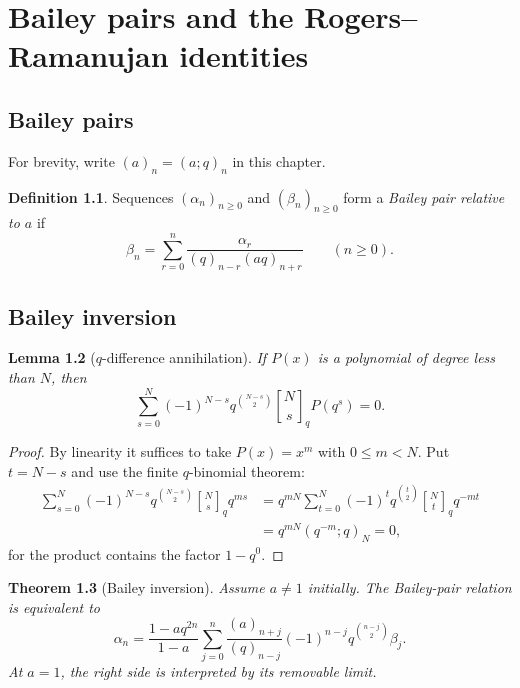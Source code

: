 \documentclass[11pt,oneside,openany]{book}
\newtheorem{theorem}{Theorem}[chapter]
\newtheorem{lemma}[theorem]{Lemma}
\theoremstyle{definition}
\newtheorem{definition}[theorem]{Definition}
\theoremstyle{remark}
\newcommand{\qbinom}[2]{\genfrac{[}{]}{0pt}{}{#1}{#2}_{q}}
\begin{document}
\chapter{Bailey pairs and the Rogers--Ramanujan identities}\label{chap:bailey}

\section{Bailey pairs}

For brevity, write $(a)_n=(a;q)_n$ in this chapter.

\begin{definition}
Sequences $(\alpha_n)_{n\ge0}$ and $(\beta_n)_{n\ge0}$ form a \emph{Bailey pair relative to $a$} if
\[
 \beta_n=\sum_{r=0}^{n}\frac{\alpha_r}{(q)_{n-r}(aq)_{n+r}}
 \qquad(n\ge0).
\]
\end{definition}

\section{Bailey inversion}

\begin{lemma}[$q$-difference annihilation]\label{lem:qdiff-annihilation}
If $P(x)$ is a polynomial of degree less than $N$, then
\[
 \sum_{s=0}^{N}(-1)^{N-s}q^{\binom{N-s}{2}}
 \qbinom Ns P(q^s)=0.
\]
\end{lemma}

\begin{proof}
By linearity it suffices to take $P(x)=x^m$ with $0\le m<N$.  Put $t=N-s$ and use the finite $q$-binomial theorem:
\begin{align*}
 \sum_{s=0}^{N}(-1)^{N-s}q^{\binom{N-s}{2}}\qbinom Ns q^{ms}
 &=q^{mN}\sum_{t=0}^{N}(-1)^tq^{\binom t2}\qbinom Ntq^{-mt}\\
 &=q^{mN}(q^{-m};q)_N=0,
\end{align*}
for the product contains the factor $1-q^0$.
\end{proof}

\begin{theorem}[Bailey inversion]\label{thm:bailey-inversion}
Assume $a\ne1$ initially.  The Bailey-pair relation is equivalent to
\[
 \alpha_n=\frac{1-aq^{2n}}{1-a}
 \sum_{j=0}^{n}
 \frac{(a)_{n+j}}{(q)_{n-j}}
 (-1)^{n-j}q^{\binom{n-j}{2}}\beta_j.
\]
At $a=1$, the right side is interpreted by its removable limit.
\end{theorem}
\end{document}
